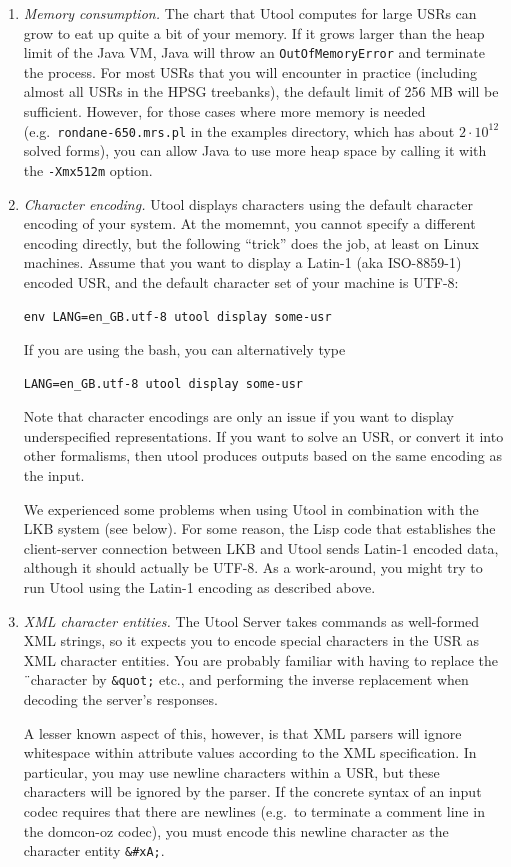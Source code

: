 \begin{enumerate}
\item \textit{Memory consumption.} The chart that Utool computes for
large USRs can grow to eat up quite a bit of your memory. If it grows
larger than the heap limit of the Java VM, Java will throw an
\verb?OutOfMemoryError? and terminate the process. For most USRs that
you will encounter in practice (including almost all USRs in the HPSG
treebanks), the default limit of 256 MB will be sufficient. However,
for those cases where more memory is needed (e.g.\
\verb?rondane-650.mrs.pl? in the examples directory, which has about
$2 \cdot 10^{12}$ solved forms), you can allow Java to use more heap
space by calling it with the \verb?-Xmx512m? option.

\item \textit{Character encoding.} Utool displays characters using the default
character encoding of your system. At the momemnt, you cannot specify a
different encoding directly, but the following ``trick'' does the job, at least
on Linux machines. Assume that you want to display a Latin-1 (aka ISO-8859-1)
encoded USR, and the default character set of your machine is UTF-8:

\begin{verbatim}
env LANG=en_GB.utf-8 utool display some-usr
\end{verbatim}
If you are using the bash, you can alternatively type
\begin{verbatim}
LANG=en_GB.utf-8 utool display some-usr
\end{verbatim}

Note that character encodings are only an issue if you want to display
underspecified representations. If you want to solve an USR, or convert it
into other formalisms, then utool produces outputs based on the same encoding as
the input.

We experienced some problems when using Utool in combination with the LKB system
(see below). For some reason, the Lisp code that establishes the client-server
connection between LKB and Utool sends Latin-1 encoded data, although it should
actually be UTF-8. As a work-around, you might try to run Utool using the
Latin-1 encoding as described above.



\item \textit{XML character entities.} The Utool Server takes commands
as well-formed XML strings, so it expects you to encode special
characters in the USR as XML character entities. You are probably
familiar with having to replace the \"\ character by \verb?&quot;?
etc., and performing the inverse replacement when decoding the
server's responses.

A lesser known aspect of this, however, is that XML parsers will
ignore whitespace within attribute values according to the XML
specification. In particular, you may use newline characters within a
USR, but these characters will be ignored by the parser. If the
concrete syntax of an input codec requires that there are newlines
(e.g.\ to terminate a comment line in the domcon-oz codec), you must
encode this newline character as the character entity \verb?&#xA;?.
\end{enumerate}




